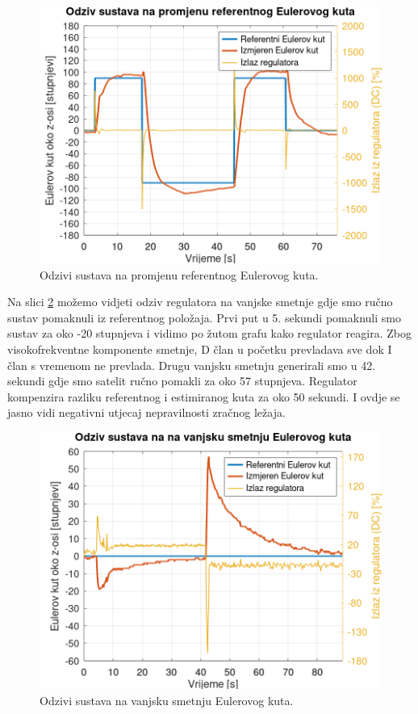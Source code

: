 \documentclass[times, utf8, diplomski, numeric]{templates/template}
\begin{document}
{{        \begin{figure}[htb]
        \centering
        \includegraphics[width=1.0\textwidth]{other/angle_reg_user.png}
        \caption{Odzivi sustava na promjenu referentnog Eulerovog kuta.}
        \label{fig:angle_reg_user}
        \end{figure}

        Na slici \ref{fig:angle_reg_dist} možemo vidjeti odziv regulatora na vanjske smetnje gdje smo ručno sustav pomaknuli iz referentnog položaja. Prvi put u 5. sekundi pomaknuli smo sustav za oko -20 stupnjeva i vidimo po žutom grafu kako regulator reagira. Zbog visokofrekventne komponente smetnje, D član u početku prevladava sve dok I član s vremenom ne prevlada. Drugu vanjsku smetnju generirali smo u 42. sekundi gdje smo satelit ručno pomakli za oko 57 stupnjeva. Regulator kompenzira razliku referentnog i estimiranog kuta za oko 50 sekundi. I ovdje se jasno vidi negativni utjecaj nepravilnosti zračnog ležaja. 

        \begin{figure}[htb]
        \centering
        \includegraphics[width=1.0\textwidth]{other/angle_reg_dist.png}
        \caption{Odzivi sustava na vanjsku smetnju Eulerovog kuta.}
        \label{fig:angle_reg_dist}
        \end{figure}
    }
}
\end{document}
